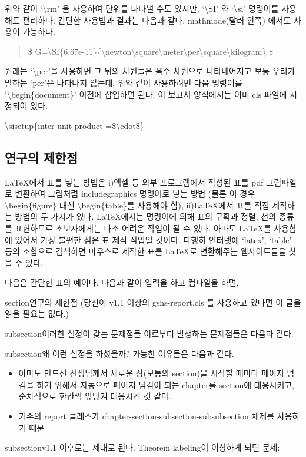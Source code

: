 \documentclass{gshs-report-v1.2}
\begin{document}
위와 같이 `\textbackslash rm' 을 사용하여 단위를 나타낼 수도 있지만,
`\textbackslash SI' 와 `\textbackslash si' 명령어를 사용해도 편리하다. 
간단한 사용법과 결과는 다음과 같다. mathmode(달러 안쪽) 에서도 사용이 가능하다.

\begin{center}
	\begin{quote}
		\$ G=\textbackslash SI\{6.67e-11\}\{\textbackslash newton\textbackslash square\textbackslash meter\textbackslash per\textbackslash square\textbackslash kilogram\} \$
	\end{quote}

\end{center}

원래는 `\textbackslash per'을 사용하면 그 뒤의 차원들은 음수 차원으로 나타내어지고 보통 우리가 말하는 `per'은 나타나지 않는데,
위와 같이 사용하려면 다음 명령어를 `\textbackslash begin\{document\}' 이전에 삽입하면 된다.
이 보고서 양식에서는 이미 cls 파일에 지정되어 있다. 
\begin{center}
	\textbackslash sisetup\{inter-unit-product =\$\textbackslash cdot\$\}
\end{center}



\subsection{연구의 제한점}

\LaTeX 에서 표를 넣는 방법은 i)엑셀 등 외부 프로그램에서 작성된 표를 pdf 그림파일로 변환하여 그림처럼 includegraphics 명령어로 넣는 방법 (물론 이 경우 {\textbackslash}begin\{figure\} 대신 {\textbackslash}begin\{table\}를 사용해야 함), ii)\LaTeX 에서 표를 직접 제작하는 방법의 두 가지가 있다. \LaTeX 에서는 명령어에 의해 표의 구획과 정렬, 선의 종류를 표현하므로 초보자에게는 다소 어려운 작업이 될 수 있다. 아마도 \LaTeX 를 사용함에 있어서 가장 불편한 점은 표 제작 작업일 것이다. 다행히 인터넷에 `latex', `table' 등의 조합으로 검색하면 마우스로 제작한 표를 \LaTeX 로 변환해주는 웹사이트들을 찾을 수 있다.

다음은 간단한 표의 예이다. 다음과 같이 입력을 하고 컴파일을 하면,

section{연구의 제한점}
(당신이 v1.1 이상의 gshs-report.cls 를 사용하고 있다면 이 글을 읽을 필요는 없다.)

subsection{이러한 설정이 갖는 문제점들}
이로부터 발생하는 문제점들은 다음과 같다.


subsection{왜 이런 설정을 하셨을까?}
가능한 이유들은 다음과 같다.
\begin{itemize}
	\item 아마도 만드신 선생님께서 새로운 장(보통의 section)을 시작할 때마다 페이지 넘김을 하기 위해서 자동으로 페이지 넘김이 되는 chapter를 section에 대응시키고, 순차적으로 한칸씩 앞당겨 대응시킨 것 같다. 
	\item 기존의 report 클래스가 chapter-section-subsection-subsubsection 체제를 사용하기 때문
\end{itemize}

subsection{v1.1 이후로는 제대로 된다.}
Theorem labeling이 이상하게 되던 문제:



\end{document}
